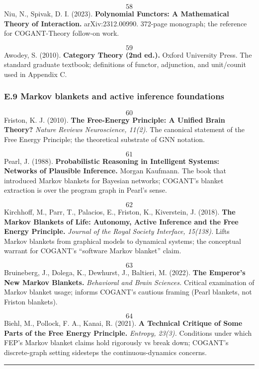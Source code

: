 \documentclass[
]{article}
\begin{document}
\[58\] Niu, N., Spivak, D. I. (2023). \textbf{Polynomial Functors: A
Mathematical Theory of Interaction.} arXiv:2312.00990. 372-page
monograph; the reference for COGANT-Theory follow-on work.

\[59\] Awodey, S. (2010). \textbf{Category Theory (2nd ed.).} Oxford
University Press. The standard graduate textbook; definitions of
functor, adjunction, and unit/counit used in Appendix C.

\subsubsection{E.9 Markov blankets and active inference
foundations}\label{e.9-markov-blankets-and-active-inference-foundations}

\[60\] Friston, K. J. (2010). \textbf{The Free-Energy Principle: A
Unified Brain Theory?} \emph{Nature Reviews Neuroscience, 11(2).} The
canonical statement of the Free Energy Principle; the theoretical
substrate of GNN notation.

\[61\] Pearl, J. (1988). \textbf{Probabilistic Reasoning in
Intelligent Systems: Networks of Plausible Inference.} Morgan Kaufmann.
The book that introduced Markov blankets for Bayesian networks; COGANT's
blanket extraction is over the program graph in Pearl's sense.

\[62\] Kirchhoff, M., Parr, T., Palacios, E., Friston, K., Kiverstein,
J. (2018). \textbf{The Markov Blankets of Life: Autonomy, Active
Inference and the Free Energy Principle.} \emph{Journal of the Royal
Society Interface, 15(138).} Lifts Markov blankets from graphical models
to dynamical systems; the conceptual warrant for COGANT's ``software
Markov blanket'' claim.

\[63\] Bruineberg, J., Dolega, K., Dewhurst, J., Baltieri, M. (2022).
\textbf{The Emperor's New Markov Blankets.} \emph{Behavioral and Brain
Sciences.} Critical examination of Markov blanket usage; informs
COGANT's cautious framing (Pearl blankets, not Friston blankets).

\[64\] Biehl, M., Pollock, F. A., Kanai, R. (2021). \textbf{A
Technical Critique of Some Parts of the Free Energy Principle.}
\emph{Entropy, 23(3).} Conditions under which FEP's Markov blanket
claims hold rigorously vs break down; COGANT's discrete-graph setting
sidesteps the continuous-dynamics concerns.

\begin{center}\rule{0.5\linewidth}{0.5pt}\end{center}
\end{document}
